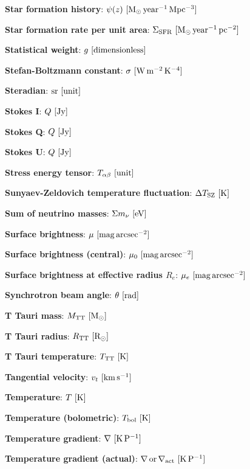 \documentclass[a4paper,10pt]{article}
\begin{document}
{\noindent}\textbf{Star formation history}: $\psi(z) ~ [{\rm M_\odot\,year^{-1}\,Mpc^{-3}}]$

{\noindent}\textbf{Star formation rate per unit area}: $\Sigma_\mathrm{SFR} ~ [{\rm M_\odot\,year^{-1}\,pc^{-2}}]$

{\noindent}\textbf{Statistical weight}: $g ~ [{\rm dimensionless}]$

{\noindent}\textbf{Stefan-Boltzmann constant}: $\sigma ~ [{\rm W\,m^{-2}\,K^{-4}}]$

{\noindent}\textbf{Steradian}: ${\rm sr} ~ [{\rm unit}]$

{\noindent}\textbf{Stokes I}: $Q ~ [{\rm Jy}]$

{\noindent}\textbf{Stokes Q}: $Q ~ [{\rm Jy}]$

{\noindent}\textbf{Stokes U}: $Q ~ [{\rm Jy}]$

{\noindent}\textbf{Stress energy tensor}: $T_{\alpha\beta} ~ [{\rm unit}]$

{\noindent}\textbf{Sunyaev-Zeldovich temperature fluctuation}: $\Delta T_\mathrm{SZ} ~ [{\rm K}]$

{\noindent}\textbf{Sum of neutrino masses}: $\Sigma m_\nu ~ [{\rm eV}]$

{\noindent}\textbf{Surface brightness}: $\mu ~ [{\rm mag\,arcsec^{-2}}]$

{\noindent}\textbf{Surface brightness (central)}: $\mu_0 ~ [{\rm mag\,arcsec^{-2}}]$

{\noindent}\textbf{Surface brightness at effective radius $R_e$}: $\mu_e ~ [{\rm mag\,arcsec^{-2}}]$

{\noindent}\textbf{Synchrotron beam angle}: $\theta ~ [{\rm rad}]$

{\noindent}\textbf{T Tauri mass}: $M_{\rm TT} ~ [{\rm M_\odot}]$

{\noindent}\textbf{T Tauri radius}: $R_{\rm TT} ~ [{\rm R_\odot}]$

{\noindent}\textbf{T Tauri temperature}: $T_{\rm TT} ~ [{\rm K}]$

{\noindent}\textbf{Tangential velocity}: $v_t ~ [{\rm km\,s^{-1}}]$

{\noindent}\textbf{Temperature}: $T ~ [{\rm K}]$

{\noindent}\textbf{Temperature (bolometric)}: $T_{\rm bol} ~ [{\rm K}]$

{\noindent}\textbf{Temperature gradient}: $\nabla ~ [{\rm K\,P^{-1}}]$

{\noindent}\textbf{Temperature gradient (actual)}: $\nabla\,{\rm or}\,\nabla_{\rm act} ~ [{\rm K\,P^{-1}}]$
\end{document}

